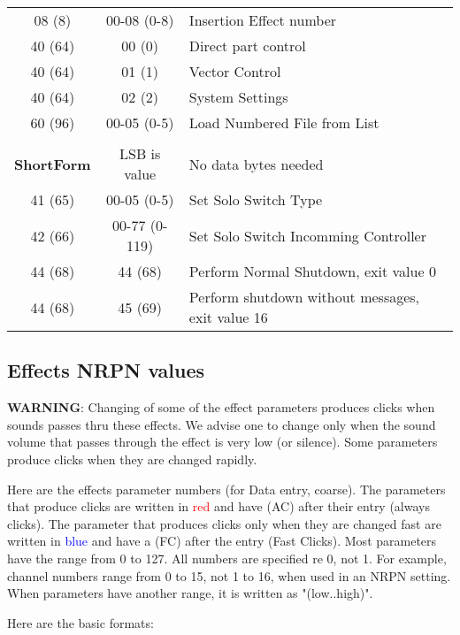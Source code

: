 \begin{table}[H]
\begin{tabular}{c c l}
        08 (8) & 00-08 (0-8)& Insertion Effect number \\
        40 (64) & 00 (0) & Direct part control \\
        40 (64) & 01 (1) & Vector Control \\
        40 (64) & 02 (2) & System Settings \\
        60 (96) & 00-05 (0-5) & Load Numbered File from List \\
        \\
    \textbf{ShortForm} &  LSB is value & No data bytes needed \\
        41 (65) & 00-05 (0-5) & Set Solo Switch Type \\
        42 (66) & 00-77 (0-119) & Set Solo Switch Incomming Controller \\
        44 (68) & 44 (68) & Perform Normal Shutdown, exit value 0 \\
        44 (68) & 45 (69) & Perform shutdown without messages, exit value 16 \\
      \end{tabular}
   \end{table}

\subsection{Effects NRPN values}
\label{subsection:effects_nrpn_values}
   \textbf{WARNING}:
   Changing of some of the effect parameters produces clicks when sounds
   passes thru these effects.  We advise one to change only when the sound
   volume that passes through the effect is very low (or silence).  Some
   parameters produce clicks when they are changed rapidly.

   Here are the effects parameter numbers (for Data entry, coarse).
   The parameters that produce clicks are written in \textcolor{red}{red}
   and have (AC) after their entry (always clicks).
   The parameter that produces clicks only when they are changed fast are
   written in \textcolor{blue}{blue} and have a (FC) after the entry (Fast
   Clicks).
   Most parameters have the range from 0 to 127.  All numbers are specified re 0,
   not 1.  For example, channel numbers range from 0 to 15, not 1 to 16, when
   used in an NRPN setting.
   When parameters have another range, it is written as "(low..high)".

   Here are the basic formats:

